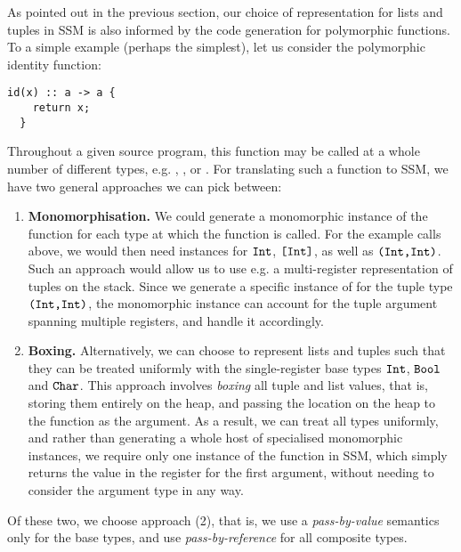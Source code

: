 As pointed out in the previous section, our choice of representation for lists
and tuples in SSM is also informed by the code generation for polymorphic
functions.
To a simple example (perhaps the simplest), let us consider the polymorphic
identity function:
\begin{lstlisting}[language=spl]
  id(x) :: a -> a {
    return x;
  }
\end{lstlisting}
%
Throughout a given source program, this function may be called at a whole number
of different types, e.g. , , or . For
translating such a function to SSM, we have two general approaches we can pick
between:
\begin{enumerate}[label={(\arabic*)}]
  \item \textbf{Monomorphisation.} We could generate a monomorphic instance of
        the  function for each type at which the function is called. For
        the example calls above, we would then need instances for $\texttt{Int}$,
        $\texttt{[}\texttt{Int}\texttt{]}$, as well as $\texttt{(}\texttt{Int}\texttt{,}\texttt{Int}\texttt{)}$.
        Such an approach would allow us to use e.g. a multi-register
        representation of tuples on the stack. Since we generate a specific
        instance of  for the tuple type $\texttt{(}\texttt{Int}\texttt{,}\texttt{Int}\texttt{)}$, the
        monomorphic instance can account for the tuple argument spanning
        multiple registers, and handle it accordingly.
  \item \textbf{Boxing.} Alternatively, we can choose to represent lists and
        tuples such that they can be treated uniformly with the single-register
        base types $\texttt{Int}$, $\texttt{Bool}$ and $\texttt{Char}$.
        This approach involves \emph{boxing} all tuple and list values, that is,
        storing them entirely on the heap, and passing the location on the heap
        to the function as the argument.
        As a result, we can treat all types uniformly, and rather than
        generating a whole host of specialised monomorphic instances, we require
        only one instance of the  function in SSM, which simply returns
        the value in the register for the first argument, without needing to
        consider the argument type in any way.
\end{enumerate}

Of these two, we choose approach (2), that is, we use a \emph{pass-by-value}
semantics only for the base types, and use \emph{pass-by-reference} for all
composite types.

